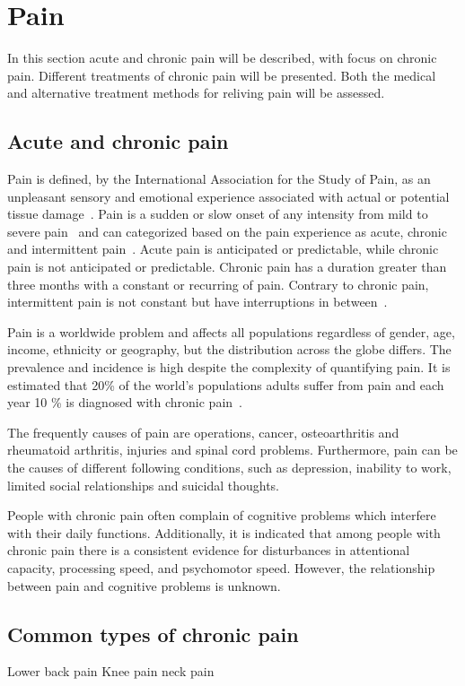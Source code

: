 \section{Pain}
In this section acute and chronic pain will be described, with focus on chronic pain. Different treatments of chronic pain will be presented. Both the medical and alternative treatment methods for reliving pain will be assessed.

\subsection{Acute and chronic pain}
Pain is defined, by the International Association for the Study of Pain, as an unpleasant sensory and emotional experience associated with actual or potential tissue damage~\cite{Kerstman2013}. 
Pain is a sudden or slow onset of any intensity from mild to severe pain~\cite{Mello2016} and can categorized based on the pain experience as acute, chronic and intermittent pain~\cite{Goldberg2011}. Acute pain is anticipated or predictable, while  chronic pain is not anticipated or predictable. Chronic pain has a duration greater than three months with a constant or recurring of pain. Contrary to chronic pain, intermittent pain is not constant but have interruptions in between~\cite{Mello2016}.

Pain is a worldwide problem and affects all populations regardless of gender, age, income, ethnicity or geography, but the distribution across the globe differs. The prevalence and incidence is high despite the complexity of quantifying pain. It is estimated that 20\% of the world's populations adults suffer from pain and each year 10 \% is diagnosed with chronic pain~\cite{Goldberg2011}. 

The frequently causes of pain are operations, cancer, osteoarthritis and rheumatoid arthritis, injuries and spinal cord problems. Furthermore, pain can be the causes of different following conditions, such as depression, inability to work, limited social relationships and suicidal thoughts.~\cite{Goldberg2011}

People with chronic pain often complain of cognitive problems which interfere with their daily functions. Additionally, it is indicated that among people with chronic pain there is a consistent evidence for disturbances in attentional capacity, processing speed, and psychomotor speed. However, the relationship between pain and cognitive problems is unknown.~\cite{Geisser2018}

\subsection{Common types of chronic pain}
Lower back pain 
Knee pain 
neck pain

